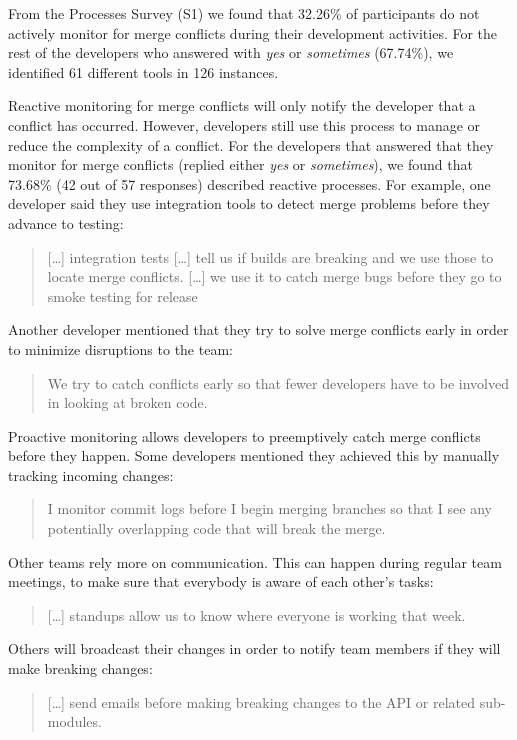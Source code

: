 From the Processes Survey (S1) we found that 32.26\% of participants do not actively monitor for merge conflicts during their development activities.
For the rest of the developers who answered with \emph{yes} or \emph{sometimes} (67.74\%), we identified 61 different tools in 126 instances.


Reactive monitoring for merge conflicts will only notify the developer that a conflict has occurred.
However, developers still use this process to manage or reduce the complexity of a conflict.
For the developers that answered that they monitor for merge conflicts (replied either \emph{yes} or \emph{sometimes}), we found that 73.68\% (42 out of 57 responses) described reactive processes.
For example, one developer said they use integration tools to detect merge problems before they advance to testing:
\begin{quotation}
	[\ldots] integration tests [\ldots] tell us if builds are breaking and we use those to locate merge conflicts. [\ldots] we use it to catch merge bugs before they go to smoke testing for release
\end{quotation}
Another developer mentioned that they try to solve merge conflicts early in order to minimize disruptions to the team:
\begin{quotation}
	We try to catch conflicts early so that fewer developers have to be involved in looking at broken code.
\end{quotation}

Proactive monitoring allows developers to preemptively catch merge conflicts before they happen.
Some developers mentioned they achieved this by manually tracking incoming changes:
\begin{quotation}
	I monitor commit logs before I begin merging branches so that I see any potentially overlapping code that will break the merge.
\end{quotation}
Other teams rely more on communication.
This can happen during regular team meetings, to make sure that everybody is aware of each other's tasks:
\begin{quotation}
	[\ldots] standups allow us to know where everyone is working that week.
\end{quotation}
Others will broadcast their changes in order to notify team members if they will make breaking changes:
\begin{quotation}
	[\ldots] send emails before making breaking changes to the API or related sub-modules.
\end{quotation}

